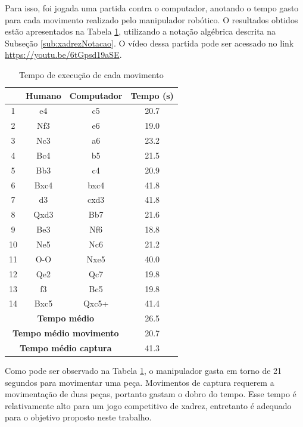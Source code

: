 Para isso, foi jogada uma partida contra o computador, anotando o tempo gasto para cada movimento realizado pelo manipulador robótico.
O resultados obtidos estão apresentados na Tabela \ref{tab:performance},
utilizando a notação algébrica descrita na Subseção \ref{sub:xadrezNotacao}.
O vídeo dessa partida pode ser acessado no link \url{https://youtu.be/6tGpsd19aSE}.

\begin{table}[H]
    \centering
    \caption{Tempo de execução de cada movimento}
    \label{tab:performance}
    \begin{tabular}{|c|c|c|c|}
        \hline
        & \textbf{Humano} & \textbf{Computador} & \textbf{Tempo (s)} \\
        \hline
        1 & e4 & c5 & 20.7 \\
        \hline
        2 & Nf3 & e6 & 19.0 \\
        \hline
        3 & Nc3 & a6 & 23.2 \\
        \hline
        4 & Bc4 & b5 & 21.5 \\
        \hline
        5 & Bb3 & c4 & 20.9 \\
        \hline
        6 & Bxc4 & bxc4 & 41.8 \\
        \hline
        7 & d3 & cxd3 & 41.8 \\
        \hline
        8 & Qxd3 & Bb7 & 21.6 \\
        \hline
        9 & Be3 & Nf6 & 18.8 \\
        \hline
        10 & Ne5 & Nc6 & 21.2 \\
        \hline
        11 & O-O & Nxe5 & 40.0 \\
        \hline
        12 & Qe2 & Qc7 & 19.8 \\
        \hline
        13 & f3 & Bc5 & 19.8 \\
        \hline
        14 & Bxc5 & Qxc5+ & 41.4 \\
        \hline
        \multicolumn{3}{|c|}{\textbf{Tempo médio}} & 26.5 \\
        \hline
        \multicolumn{3}{|c|}{\textbf{Tempo médio movimento}} & 20.7 \\
        \hline
        \multicolumn{3}{|c|}{\textbf{Tempo médio captura}} & 41.3 \\
        \hline
    \end{tabular}
\end{table}

Como pode ser observado na Tabela \ref{tab:performance}, o manipulador gasta em torno de 21 segundos para movimentar uma peça.
Movimentos de captura requerem a movimentação de duas peças, portanto gastam o dobro do tempo.
Esse tempo é relativamente alto para um jogo competitivo de xadrez, entretanto é adequado para o objetivo proposto neste trabalho.